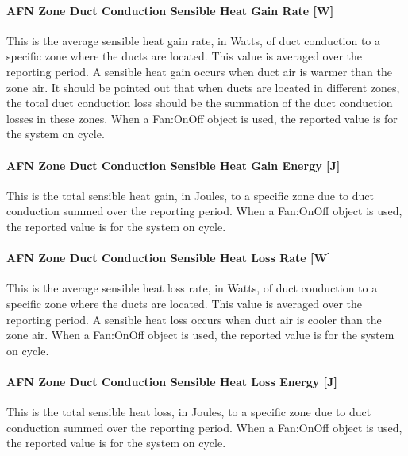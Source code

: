 \paragraph{AFN Zone Duct Conduction Sensible Heat Gain Rate {[}W{]}}\label{afn-zone-duct-conduction-sensible-heat-gain-rate-w}

This is the average sensible heat gain rate, in Watts, of duct conduction to a specific zone where the ducts are located. This value is averaged over the reporting period. A sensible heat gain occurs when duct air is warmer than the zone air. It should be pointed out that when ducts are located in different zones, the total duct conduction loss should be the summation of the duct conduction losses in these zones. When a Fan:OnOff object is used, the reported value is for the system on cycle.

\paragraph{AFN Zone Duct Conduction Sensible Heat Gain Energy {[}J{]}}\label{afn-zone-duct-conduction-sensible-heat-gain-energy-j}

This is the total sensible heat gain, in Joules, to a specific zone due to duct conduction summed over the reporting period. When a Fan:OnOff object is used, the reported value is for the system on cycle.

\paragraph{AFN Zone Duct Conduction Sensible Heat Loss Rate {[}W{]}}\label{afn-zone-duct-conduction-sensible-heat-loss-rate-w}

This is the average sensible heat loss rate, in Watts, of duct conduction to a specific zone where the ducts are located. This value is averaged over the reporting period. A sensible heat loss occurs when duct air is cooler than the zone air. When a Fan:OnOff object is used, the reported value is for the system on cycle.

\paragraph{AFN Zone Duct Conduction Sensible Heat Loss Energy {[}J{]}}\label{afn-zone-duct-conduction-sensible-heat-loss-energy-j}

This is the total sensible heat loss, in Joules, to a specific zone due to duct conduction summed over the reporting period. When a Fan:OnOff object is used, the reported value is for the system on cycle.

